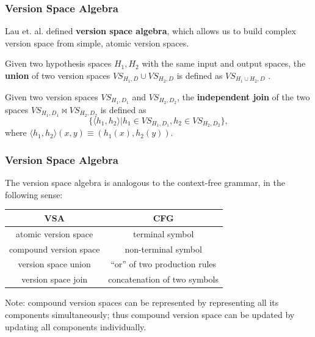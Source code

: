 \documentclass[]{beamer}
\begin{document}
\begin{frame}
\frametitle{Version Space Algebra}

Lau et. al. defined \textbf{version space algebra}, which allows us to build complex version space from simple, atomic version spaces.

\pause 

\begin{definition}
	Given two hypothesis spaces $H_1, H_2$ with the same input and output spaces, the \textbf{union} of two version spaces $VS_{H_1, D} \cup VS_{H_2, D}$ is defined as $VS_{H_1 \cup H_2, D}$ .
\end{definition}

\begin{definition}
	Given two version spaces $VS_{H_1, D_1}$ and $VS_{H_2, D_2}$, the \textbf{independent join} of the two spaces $VS_{H_1, D_1} \bowtie VS_{H_2, D_2}$ is defined as $$\{\langle h_1, h_2 \rangle| h_1 \in VS_{H_1, D_1}, h_2 \in VS_{H_2, D_2}\},$$
	where
	$ \langle h_1, h_2 \rangle (x, y) \equiv (h_1(x), h_2(y))$.
\end{definition}

\end{frame}

\begin{frame}
	\frametitle{Version Space Algebra}
	The version space algebra is analogous to the context-free grammar, in the following sense:
	\begin{table}[h]
		\centering
	\begin{tabular}{|c|c|}
		\hline 
		\textbf{VSA} & \textbf{CFG} \\ 
		\hline 
		atomic version space & terminal symbol \\ 
		compound version space & non-terminal symbol \\ 
		version space union & ``or'' of two production rules \\ 
		version space join & concatenation of two symbols \\ 
		\hline 
	\end{tabular} 
	\end{table}

	Note: compound version spaces can be represented by representing all its components simultaneously; thus compound version space can be updated by updating all components individually.
\end{frame}
\end{document}

